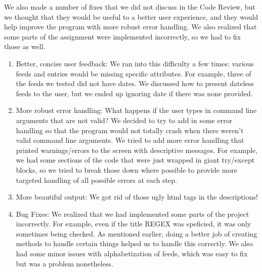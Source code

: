 \documentclass{article}
\begin{document}
We also made a number of fixes that we did not discuss in the Code Review, but we thought that they would be useful to a better user experience, and they would help improve the program with more robust error handling.  We also realized that some parts of the assignment were implemented incorrectly, so we had to fix those as well.

\begin{enumerate}
\item Better, concise user feedback: We ran into this difficulty a few times: various feeds and entries would be missing specific attributes.  For example, three of the feeds we tested did not have dates.  We discussed how to present dateless feeds to the user, but we ended up ignoring date if there was none provided.
\item More robust error handling: What happens if the user types in command line arguments that are not valid?  We decided to try to add in some error handling so that the program would not totally crash when there weren't valid command line arguments. We tried to add more error handling that printed warnings/errors to the screen with descriptive messages. For example, we had some sections of the code that were just wrapped in giant try/except blocks, so we tried to break those down where possible to provide more targeted handling of all possible errors at each step.
\item More beautiful output: We got rid of those ugly html tags in the descriptions!
\item Bug Fixes: We realized that we had implemented some parts of the project incorrectly. For example, even if the title REGEX was speficied, it was only sometimes being checked. As mentioned earlier, doing a better job of creating methods to handle certain things helped us to handle this correctly. We also had some minor issues with alphabetization of feeds, which was easy to fix but was a problem nonetheless.
\end{enumerate}
\end{document}
